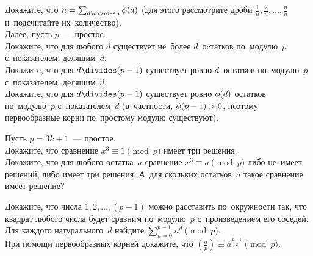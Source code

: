 \begin{problems}

\item
\subproblem
Докажите, что
\(
    n = \sum_{d \divides n} \eulerphi(d)
\)
(для этого рассмотрите дроби $\frac{1}{n}, \frac{2}{n}, \ldots, \frac{n}{n}$
и~подсчитайте их~количество).
\\
Далее, пусть $p$~--- простое.
\\
\subproblem
Докажите, что для любого $d$ существует не~более $d$~оcтатков по~модулю~$p$
с~показателем, делящим~$d$.
\\
\subproblem
Докажите, что для $d \divides (p - 1)$ существует ровно $d$~остатков по~модулю~$p$
с~показателем, делящим~$d$.
\\
\subproblem
Докажите, что для $d \divides (p - 1)$ существует ровно $\mathrm{\phi}(d)$ остатков
по~модулю~$p$ с~показателем~$d$
(в~частности, $\mathrm{\phi}(p - 1) > 0$, поэтому первообразные корни
по~простому модулю существуют).

\item
Пусть $p = 3 k + 1$~--- простое.
\\
\subproblem
Докажите, что сравнение $x^3 \equiv 1 \pmod p$ имеет три решения.
\\
\subproblem
Докажите, что для любого остатка~$a$ сравнение $x^3 \equiv a \pmod p$ либо
не~имеет решений, либо имеет три решения.
А~для скольких остатков~$a$ такое сравнение имеет решение?

\item
\subproblem
Докажите, что числа $1, 2, \ldots, (p - 1)$ можно расставить по~окружности так,
что квадрат любого числа будет сравним по~модулю~$p$ с~произведением его
соседей.
\\
\subproblem
Для каждого натурального~$d$ найдите
\(
    \sum_{n=0}^{p-1} n^d \pmod p
\).
\\
\subproblem
При помощи первообразных корней докажите, что
\(
    \genfrac{(}{)}{}{}{a}{p}
\equiv
    a^{\frac{p-1}{2}}
\pmod p
\).


\end{problems}
